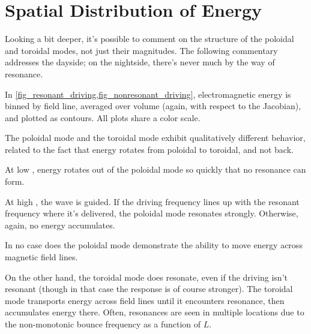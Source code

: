

\section{Spatial Distribution of Energy}
  \label{sec_shells}

Looking a bit deeper, it's possible to comment on the structure of the poloidal and toroidal modes, not just their magnitudes. The following commentary addresses the dayside; on the nightside, there's never much by the way of resonance. 

In \cref{fig_resonant_driving,fig_nonresonant_driving}, electromagnetic energy is binned by field line, averaged over volume (again, with respect to the Jacobian), and plotted as contours. All plots share a color scale. 

The poloidal mode and the toroidal mode exhibit qualitatively different behavior, related to the fact that energy rotates from poloidal to toroidal, and not back. 

At low \azm, energy rotates out of the poloidal mode so quickly that no resonance can form. 

At high \azm, the \Alfven wave is guided. If the driving frequency lines up with the resonant frequency where it's delivered, the poloidal mode resonates strongly. Otherwise, again, no energy accumulates. 

In no case does the poloidal mode demonstrate the ability to move energy across magnetic field lines. 

On the other hand, the toroidal mode does resonate, even if the driving isn't resonant (though in that case the response is of course stronger). The toroidal mode transports energy across field lines until it encounters resonance, then accumulates energy there. Often, resonances are seen in multiple locations due to the non-monotonic \Alfven bounce frequency as a function of $L$. 

